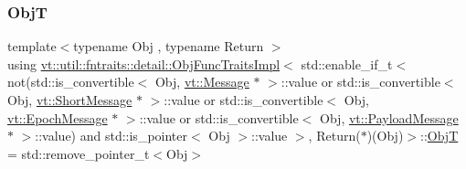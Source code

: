 \subsubsection{\texorpdfstring{ObjT}{ObjT}}
{\footnotesize\ttfamily template$<$typename Obj , typename Return $>$ \\
using \hyperlink{structvt_1_1util_1_1fntraits_1_1detail_1_1_obj_func_traits_impl}{vt\+::util\+::fntraits\+::detail\+::\+Obj\+Func\+Traits\+Impl}$<$ std\+::enable\+\_\+if\+\_\+t$<$ not(std\+::is\+\_\+convertible$<$ Obj, \hyperlink{namespacevt_a3a3ddfef40b4c90915fa43cdd5f129ea}{vt\+::\+Message} $\ast$ $>$\+::value or std\+::is\+\_\+convertible$<$ Obj, \hyperlink{namespacevt_a1125ac1da6c0bbf141e0ea0739d7602d}{vt\+::\+Short\+Message} $\ast$ $>$\+::value or std\+::is\+\_\+convertible$<$ Obj, \hyperlink{namespacevt_ad67368ffae52d7325002586b41bb150e}{vt\+::\+Epoch\+Message} $\ast$ $>$\+::value or std\+::is\+\_\+convertible$<$ Obj, \hyperlink{namespacevt_a89a92229c5622b855c02c549f83a1a68}{vt\+::\+Payload\+Message} $\ast$ $>$\+::value) and std\+::is\+\_\+pointer$<$ Obj $>$\+::value $>$, Return($\ast$)(Obj)$>$\+::\hyperlink{structvt_1_1util_1_1fntraits_1_1detail_1_1_obj_func_traits_impl_3_01std_1_1enable__if__t_3_01not8a3cf894b8afc41bf28f29f3b0ac693f_ae2bf3b7ac64ebdf6acf2cbfdf4a7edd7}{ObjT} =  std\+::remove\+\_\+pointer\+\_\+t$<$Obj$>$}

